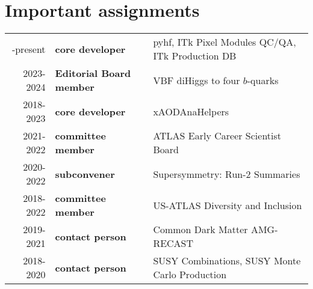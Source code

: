 \vspace{-4.5em}\section{Important assignments}\label{sec:important-assignments}
{
	\footnotesize
	\begin{tabular}{r|>{\bfseries}ll}
		\centering
		2018-present & core developer         & pyhf, ITk Pixel Modules QC/QA, ITk Production DB \\
		2023-2024    & Editorial Board member & VBF diHiggs to four $b$-quarks                   \\
		2018-2023    & core developer         & xAODAnaHelpers                                   \\
		2021-2022    & committee member       & ATLAS Early Career Scientist Board               \\
		2020-2022    & subconvener            & Supersymmetry: Run-2 Summaries                   \\
		2018-2022    & committee member       & US-ATLAS Diversity and Inclusion                 \\
		2019-2021    & contact person         & Common Dark Matter AMG-RECAST                    \\
		2018-2020    & contact person         & SUSY Combinations, SUSY Monte Carlo Production   \\
	\end{tabular}
}


